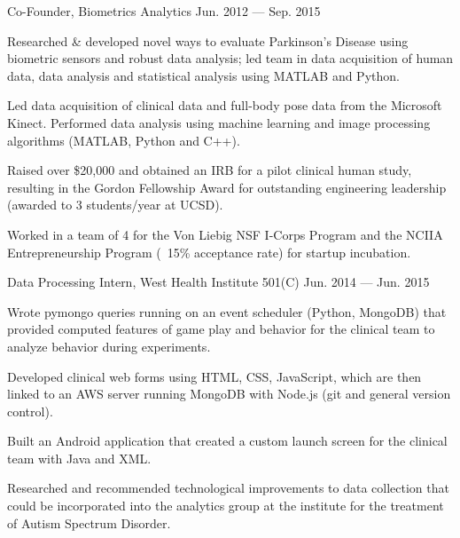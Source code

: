 \begin{cventries}
    \cvproject
    {Co-Founder, Biometrics Analytics} %
    {Jun. 2012 --- Sep. 2015} %
    {
      \begin{cvitems} %
        \item{Researched \& developed novel ways to evaluate Parkinson's Disease using biometric sensors and robust data analysis; led team in data acquisition of human data, data analysis and statistical analysis using MATLAB and Python.}
        \item{Led data acquisition of clinical data and full-body pose data from the Microsoft Kinect. Performed data analysis using machine learning and image processing algorithms (MATLAB, Python and C++).}
        \item{Raised over \$20,000 and obtained an IRB for a pilot clinical human study, resulting in the Gordon Fellowship Award for outstanding engineering leadership (awarded to 3 students/year at UCSD).}
        \item{Worked in a team of 4 for the Von Liebig NSF I-Corps Program and the NCIIA Entrepreneurship Program (~15\% acceptance rate) for startup incubation.}
      \end{cvitems}
    }
    \newline
    
    \cvproject
    {Data Processing Intern, West Health Institute 501(C)} %
    {Jun. 2014 --- Jun. 2015} %
    {
      \begin{cvitems} %
        \item{Wrote pymongo queries running on an event scheduler (Python, MongoDB) that provided computed features of game play and behavior for the clinical team to analyze behavior during experiments.}
        \item{Developed clinical web forms using HTML, CSS, JavaScript, which are then linked to an AWS server running MongoDB with Node.js (git and general version control).}
        \item{Built an Android application that created a custom launch screen for the clinical team with Java and XML.}
        \item{Researched and recommended technological improvements to data collection that could be incorporated into the analytics group at the institute for the treatment of Autism Spectrum Disorder.}
      \end{cvitems}
    }
    \newline
    

\end{cventries}
